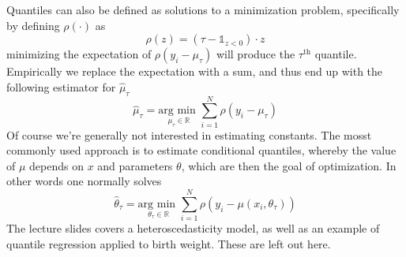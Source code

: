 Quantiles can also be defined as solutions to a minimization problem, specifically by defining $\rho(\cdot)$ as
\begin{equation}
\rho(z) = (\tau - \mathds{1}_{z<0}) \cdot z
\end{equation}
minimizing the expectation of $\rho(y_i - \mu_{\tau})$ will produce the $\tau^{\textrm{th}}$ quantile. Empirically we replace the expectation with a sum, and thus end up with the following estimator for $\hat{\mu}_{\tau}$
\begin{equation}
\hat{\mu}_{\tau} = \underset{\mu_{\tau} \in \mathbb{R}}{\textrm{arg min }} \sum_{i = 1}^N \rho(y_i - \mu_{\tau})
\end{equation}
Of course we're generally not interested in estimating constants. The mosst commonly used approach is to estimate conditional quantiles, whereby the value of $\mu$ depends on $x$ and parameters $\theta$, which are then the goal of optimization. In other words one normally solves
\begin{equation}
\hat{\theta}_{\tau} = \underset{\theta_{\tau} \in \mathbb{R}}{\textrm{arg min }} \sum_{i = 1}^N \rho(y_i - \mu(x_i, \theta_{\tau}))
\end{equation}
The lecture slides covers a heteroscedasticity model, as well as an example of quantile regression applied to birth weight. These are left out here. 
